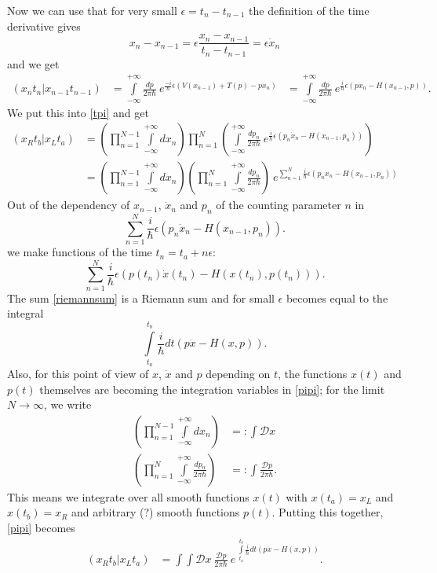 Now we can use that for very small $\epsilon = t_n - t_{n-1}$ the definition of the time derivative gives
\begin{equation}\label{deriv}
  x_{n} - x_{n-1} = \epsilon \frac{x_{n} -x_{n-1}}{t_n - t_{n-1}} =  \epsilon \dot{x}_n
\end{equation}
and we get
\begin{align}
   (x_n t_n | x_{n-1} t_{n-1})  &=  \int\limits_{-\infty}^{+\infty} \frac{dp}{2 \pi \hbar}  \ e^{\frac{-i}{\hbar} \epsilon ( V(x_{n-1}) + T(p) - p \dot{x}_n)}
                                &=  \int\limits_{-\infty}^{+\infty} \frac{dp}{2 \pi \hbar}  \ e^{\frac{i}{\hbar} \epsilon (p \dot{x}_n - H(x_{n-1},p))}.
\end{align}
We put this into \ref{tpi} and get 
\begin{align}
  (x_R t_b | x_L t_a) &=  (\prod_{n=1}^{N-1} \int\limits_{-\infty}^{+\infty} dx_{n})\prod_{n=1}^{N} (\int\limits_{-\infty}^{+\infty} \frac{dp_n}{2 \pi \hbar}  \ e^{\frac{i}{\hbar} \epsilon (p_n \dot{x}_n - H(x_{n-1},p_n))})  \\
                      &=  (\prod_{n=1}^{N-1} \int\limits_{-\infty}^{+\infty} dx_{n})(\prod_{n=1}^{N} \int\limits_{-\infty}^{+\infty}  \frac{dp_n}{2 \pi \hbar}) \ e^{\sum_{n=1}^{N}\frac{i}{\hbar} \epsilon (p_n \dot{x}_n - H(x_{n-1},p_n))} \label{pipi}
\end{align}
Out of the dependency of $x_{n-1}$, $\dot{x}_n$ and $p_n$ of the counting parameter $n$ in
\begin{equation}
  \sum_{n=1}^{N}\frac{i}{\hbar} \epsilon (p_n \dot{x}_n - H(x_{n-1},p_n)).
\end{equation}
we make  functions of the time $t_n = t_a + n \epsilon$:
\begin{equation}\label{riemannsum}
  \sum_{n=1}^{N}\frac{i}{\hbar} \epsilon (p(t_n) \dot{x}(t_n) - H(x(t_n),p(t_n))).
\end{equation}
The sum \ref{riemannsum} is a Riemann sum and for small $\epsilon$ becomes equal to the integral
\begin{equation}
  \int\limits_{t_a}^{t_b}  \frac{i}{\hbar} dt (p \dot{x} - H(x,p)).
\end{equation}
Also, for this point of view of  $x$, $\dot{x}$ and $p$ depending on $t$, the functions $x(t)$ and $p(t)$ themselves are becoming the integration variables in \ref{pipi}; for the limit $N \rightarrow \infty$, we write
\begin{align}
     (\prod_{n=1}^{N-1} \int\limits_{-\infty}^{+\infty} dx_{n}) &=: \int \mathcal{D} x   \\
     (\prod_{n=1}^{N} \int\limits_{-\infty}^{+\infty}  \frac{dp_n}{2 \pi \hbar}) &=: \int \frac{ \mathcal{D}p}{2 \pi \hbar}.
\end{align}
This means we integrate over all smooth functions $x(t)$ with $x(t_a) = x_L$ and $x(t_b) = x_R$ and arbitrary (?) smooth functions $p(t)$.
Putting this together, \ref{pipi} becomes
\begin{align}
  (x_R t_b | x_L t_a) &=  \int \int  \mathcal{D} x \ \frac{ \mathcal{D}p}{2 \pi \hbar} \ e^{ \  \int\limits_{t_a}^{t_b}  \frac{i}{\hbar} dt (p \dot{x} - H(x,p))} .
\end{align}

